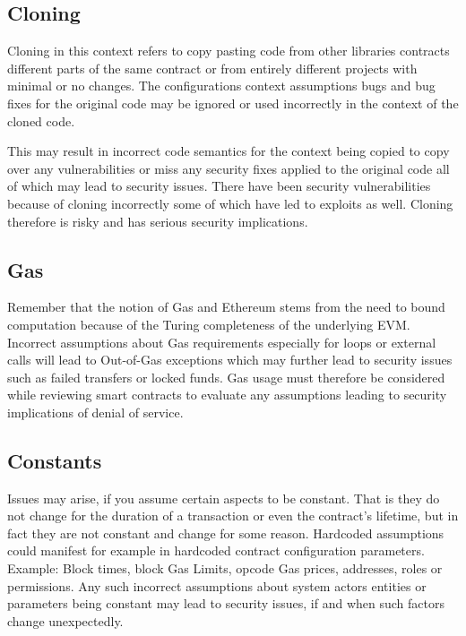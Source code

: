 \subsection{Cloning}\label{cloning}

Cloning in this context refers to copy pasting code from other libraries
contracts different parts of the same contract or from entirely
different projects with minimal or no changes. The configurations
context assumptions bugs and bug fixes for the original code may be
ignored or used incorrectly in the context of the cloned code.

This may result in incorrect code semantics for the context being copied
to copy over any vulnerabilities or miss any security fixes applied to
the original code all of which may lead to security issues. There have
been security vulnerabilities because of cloning incorrectly some of
which have led to exploits as well. Cloning therefore is risky and has
serious security implications.

\subsection{Gas}\label{gas}

Remember that the notion of Gas and Ethereum stems from the need to
bound computation because of the Turing completeness of the underlying
EVM. Incorrect assumptions about Gas requirements especially for loops
or external calls will lead to Out-of-Gas exceptions which may further
lead to security issues such as failed transfers or locked funds. Gas
usage must therefore be considered while reviewing smart contracts to
evaluate any assumptions leading to security implications of denial of
service.

\subsection{Constants}\label{constants}

Issues may arise, if you assume certain aspects to be constant. That is
they do not change for the duration of a transaction or even the
contract's lifetime, but in fact they are not constant and change for
some reason. Hardcoded assumptions could manifest for example in
hardcoded contract configuration parameters. Example: Block times, block
Gas Limits, opcode Gas prices, addresses, roles or permissions. Any such
incorrect assumptions about system actors entities or parameters being
constant may lead to security issues, if and when such factors change
unexpectedly.

